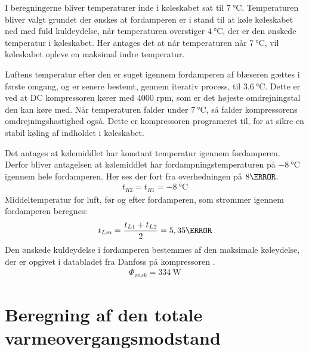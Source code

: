 \documentclass[../Hovedrapport.tex]{subfiles}
\begin{document}
I beregningerne bliver temperaturer inde i køleskabet  sat til $\SI{7}{\celsius}$. Temperaturen bliver valgt grundet der ønskes at fordamperen er i stand til at køle køleskabet ned med fuld kuldeydelse, når temperaturen overstiger $\SI{4}{\celsius}$, der er den ønskede temperatur i køleskabet. Her antages det at når temperaturen når $\SI{7}{\celsius}$, vil køleskabet opleve en maksimal indre temperatur. %


Luftens temperatur efter den er suget igennem fordamperen af blæseren gættes i første omgang, og er senere bestemt, gennem iterativ process, til $\SI{3,6}{\celsius}$. Dette er ved at DC kompressoren kører med 4000 rpm, som er det højeste omdrejningstal den kan køre med. Når temperaturen falder under  $\SI{7}{\celsius}$, så falder kompressorens omdrejningshastighed også. Dette er kompressoren programeret til, for at sikre en stabil køling af indholdet i køleskabet.


Det antages at kølemiddlet har konstant temperatur igennem fordamperen. Derfor bliver antagelsen at kølemiddlet har fordampningstemperaturen på $\SI{-8}{\celsius}$ igennem hele fordamperen. Her ses der fort fra overhedningen på $\si{8}{\celsius}$.
\begin{align}
    t_{R2}= t_{R1} = \SI{-8}{\celsius}   
\end{align}
Middeltemperatur for luft, før og efter fordamperen, som strømmer igennem fordamperen beregnes:
\begin{align}
    t_{Lm}= \dfrac{t_{L1}+t_{L2}}{2} = \si{5,35}{\celsius} %
\end{align}
Den ønskede kuldeydelse i fordamperen bestemmes af den maksimale køleydelse, der er opgivet i databladet fra Danfoss på kompressoren \citep{Coolselector_BD350GH}.
\begin{align}
   \si{\Phi_{\textit{ønsk}}}=\SI{334}{\watt}
\end{align}

\section{Beregning af den totale varmeovergangsmodstand}
    \label{sec:Beregning af den totle varmeovergangsmodstand}
\end{document}
